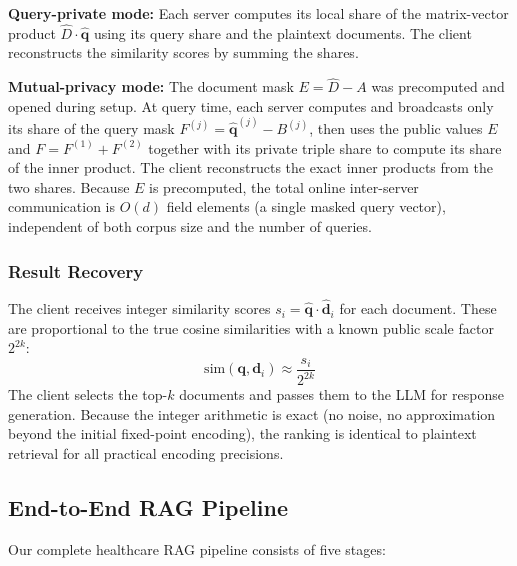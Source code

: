 \documentclass[conference]{IEEEtran}
\newcommand{\query}{\mathbf{q}}
\newcommand{\doc}{\mathbf{d}}
\begin{document}
\textbf{Query-private mode:} Each server computes its local share of the
matrix-vector product $\hat{D} \cdot \hat{\query}$ using its query share
and the plaintext documents. The client reconstructs the similarity scores
by summing the shares.

\textbf{Mutual-privacy mode:} The document mask $E = \hat{D} - A$ was
precomputed and opened during setup. At query time, each server computes
and broadcasts only its share of the query mask
$F^{(j)} = \hat{\query}^{(j)} - B^{(j)}$, then uses the public values
$E$ and $F = F^{(1)} + F^{(2)}$ together with its private triple share to
compute its share of the inner product. The client reconstructs
the exact inner products from the two shares. Because $E$ is precomputed,
the total online inter-server communication is $O(d)$ field elements
(a single masked query vector), independent of both corpus size and
the number of queries.

\subsubsection{Result Recovery}
The client receives integer similarity scores
$s_i = \hat{\query} \cdot \hat{\doc}_i$ for each document. These are
proportional to the true cosine similarities with a known public scale
factor $2^{2k}$:
\begin{equation}
    \text{sim}(\query, \doc_i) \approx \frac{s_i}{2^{2k}}
    \label{eq:recovery}
\end{equation}
The client selects the top-$k$ documents and passes them to the LLM for
response generation. Because the integer arithmetic is exact (no noise, no
approximation beyond the initial fixed-point encoding), the ranking is
identical to plaintext retrieval for all practical encoding precisions.


\subsection{End-to-End RAG Pipeline}
\label{sec:pipeline}

Our complete healthcare RAG pipeline consists of five stages:
\end{document}
